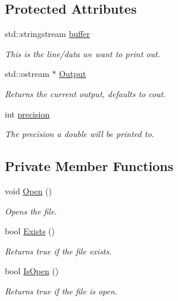 \subsection*{Protected Attributes}
\begin{DoxyCompactItemize}
\item 
std::stringstream \hyperlink{classJKBuilder_1_1IOManager_adbf6a7492c6521b38c1510aebe307770}{buffer}
\begin{DoxyCompactList}\small\item\em This is the line/data we want to print out. \item\end{DoxyCompactList}\item 
std::ostream $\ast$ \hyperlink{classJKBuilder_1_1IOManager_aafe3b1218427d92a689d147f74e74f4b}{Output}
\begin{DoxyCompactList}\small\item\em Returns the current output, defaults to cout. \item\end{DoxyCompactList}\item 
int \hyperlink{classJKBuilder_1_1IOManager_aa95455ed52a8459fad69509a4a0411b5}{precision}
\begin{DoxyCompactList}\small\item\em The precision a double will be printed to. \item\end{DoxyCompactList}\end{DoxyCompactItemize}
\subsection*{Private Member Functions}
\begin{DoxyCompactItemize}
\item 
void \hyperlink{classJKBuilder_1_1FileManager_a5e53001785ff30ae485a113b9b8a0ddc}{Open} ()
\begin{DoxyCompactList}\small\item\em Opens the file. \item\end{DoxyCompactList}\item 
bool \hyperlink{classJKBuilder_1_1FileManager_aa9a207f89881ad3eeb418619bef880ed}{Exists} ()
\begin{DoxyCompactList}\small\item\em Returns true if the file exists. \item\end{DoxyCompactList}\item 
bool \hyperlink{classJKBuilder_1_1FileManager_a1822528b9d87e3897acff000f0ef4629}{IsOpen} ()
\begin{DoxyCompactList}\small\item\em Returns true if the file is open. \item\end{DoxyCompactList}\end{DoxyCompactItemize}
